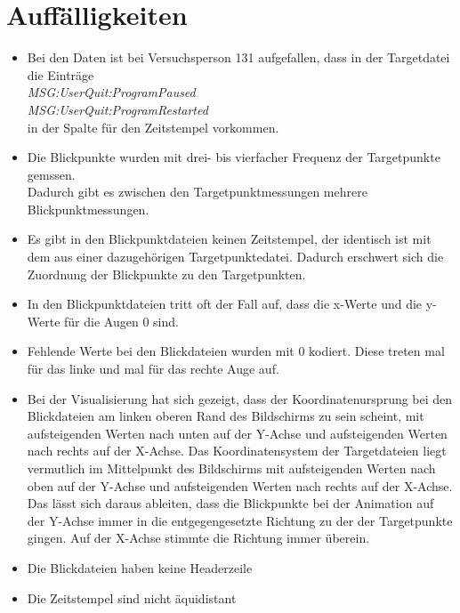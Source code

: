 \chapter{Auff\"alligkeiten}
\begin{itemize}
	\item Bei den Daten ist bei Versuchsperson 131 aufgefallen, dass in der Targetdatei die Eintr\"age\\
		\textit{MSG:UserQuit:ProgramPaused}\\
		\textit{MSG:UserQuit:ProgramRestarted}
		\\ in der Spalte f\"ur den Zeitstempel vorkommen.
	
	\item Die Blickpunkte wurden mit drei- bis vierfacher Frequenz der Targetpunkte gemssen. \\
		Dadurch gibt es zwischen den Targetpunktmessungen mehrere Blickpunktmessungen.
	
	\item Es gibt in den Blickpunktdateien keinen Zeitstempel, der identisch ist mit dem aus einer dazugeh\"origen Targetpunktedatei. Dadurch erschwert sich die Zuordnung der Blickpunkte zu den Targetpunkten.
	
	\item In den Blickpunktdateien tritt oft der Fall auf, dass die x-Werte und die y-Werte für die Augen 0 sind.
	
	\item Fehlende Werte bei den Blickdateien wurden mit 0 kodiert. Diese treten mal f\"ur das linke und mal f\"ur das rechte Auge auf.
	
	\item Bei der Visualisierung hat sich gezeigt, dass der Koordinatenursprung bei den Blickdateien am linken oberen Rand des Bildschirms zu sein scheint, mit aufsteigenden Werten nach unten auf der Y-Achse und aufsteigenden Werten nach rechts auf der X-Achse. Das Koordinatensystem der Targetdateien liegt vermutlich im Mittelpunkt des Bildschirms mit aufsteigenden Werten nach oben auf der Y-Achse und aufsteigenden Werten nach rechts auf der X-Achse. Das l\"asst sich daraus ableiten, dass die Blickpunkte bei der Animation auf der Y-Achse immer in die entgegengesetzte Richtung zu der der Targetpunkte gingen. Auf der X-Achse stimmte die Richtung immer überein.
	
	\item Die Blickdateien haben keine Headerzeile
	
	\item Die Zeitstempel sind nicht \"aquidistant
	

\end{itemize}
